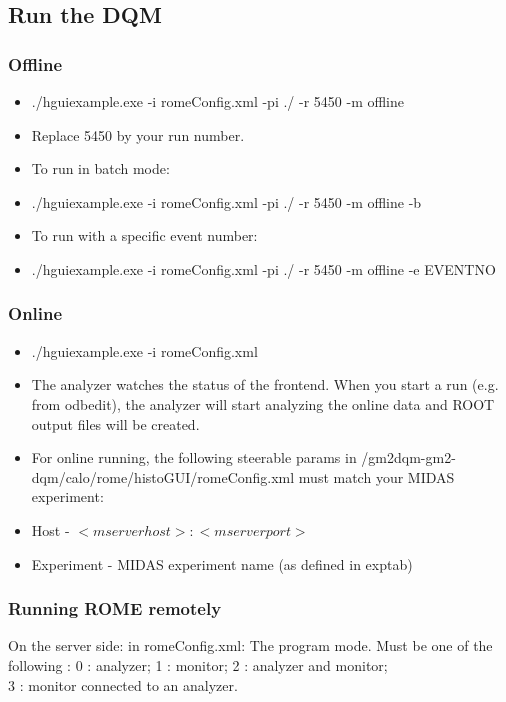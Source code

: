 \subsection{Run the DQM}
\subsubsection{Offline}
\begin{itemize}
\item ./hguiexample.exe -i romeConfig.xml -pi ./ -r 5450 -m offline
\item Replace 5450 by your run number.
\item To run in batch mode:
\item ./hguiexample.exe -i romeConfig.xml -pi ./ -r 5450 -m offline -b
\item To run with a specific event number:
\item ./hguiexample.exe -i romeConfig.xml -pi ./ -r 5450 -m offline -e EVENTNO

\end{itemize}

\subsubsection{Online}
\begin{itemize}
\item ./hguiexample.exe -i romeConfig.xml
\item The analyzer watches the status of the frontend. When you start a run (e.g. from odbedit), the analyzer will start analyzing the online data and ROOT output files will be created.

\item For online running, the following steerable params in /gm2dqm-gm2-dqm/calo/rome/histoGUI/romeConfig.xml must match your MIDAS experiment:

    \item Host - $<mserver host>:<mserver port>$
    \item Experiment - MIDAS experiment name (as defined in exptab)

\end{itemize}

\subsubsection{Running ROME remotely}

On the server side: in romeConfig.xml:
The program mode. Must be one of the following : 0 : analyzer; 1 : monitor; 2 : analyzer and monitor;\\
 3 : monitor connected to an analyzer.

